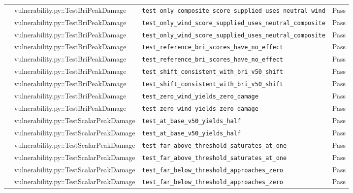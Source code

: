 \documentclass[11pt,a4paper]{article}
\begin{document}
\begin{center}
\begin{longtable}{p{2.2cm} p{4.5cm} p{6.5cm} p{1.4cm}}
     & vulnerability.py::TestBriPeakDamage & \texttt{test\_only\_composite\_score\_supplied\_uses\_neutral\_wind} & \textcolor{green!60!black}{Pass} \\
     & vulnerability.py::TestBriPeakDamage & \texttt{test\_only\_wind\_score\_supplied\_uses\_neutral\_composite} & \textcolor{green!60!black}{Pass} \\
     & vulnerability.py::TestBriPeakDamage & \texttt{test\_only\_wind\_score\_supplied\_uses\_neutral\_composite} & \textcolor{green!60!black}{Pass} \\
     & vulnerability.py::TestBriPeakDamage & \texttt{test\_reference\_bri\_scores\_have\_no\_effect} & \textcolor{green!60!black}{Pass} \\
     & vulnerability.py::TestBriPeakDamage & \texttt{test\_reference\_bri\_scores\_have\_no\_effect} & \textcolor{green!60!black}{Pass} \\
     & vulnerability.py::TestBriPeakDamage & \texttt{test\_shift\_consistent\_with\_bri\_v50\_shift} & \textcolor{green!60!black}{Pass} \\
     & vulnerability.py::TestBriPeakDamage & \texttt{test\_shift\_consistent\_with\_bri\_v50\_shift} & \textcolor{green!60!black}{Pass} \\
     & vulnerability.py::TestBriPeakDamage & \texttt{test\_zero\_wind\_yields\_zero\_damage} & \textcolor{green!60!black}{Pass} \\
     & vulnerability.py::TestBriPeakDamage & \texttt{test\_zero\_wind\_yields\_zero\_damage} & \textcolor{green!60!black}{Pass} \\
     & vulnerability.py::TestScalarPeakDamage & \texttt{test\_at\_base\_v50\_yields\_half} & \textcolor{green!60!black}{Pass} \\
     & vulnerability.py::TestScalarPeakDamage & \texttt{test\_at\_base\_v50\_yields\_half} & \textcolor{green!60!black}{Pass} \\
     & vulnerability.py::TestScalarPeakDamage & \texttt{test\_far\_above\_threshold\_saturates\_at\_one} & \textcolor{green!60!black}{Pass} \\
     & vulnerability.py::TestScalarPeakDamage & \texttt{test\_far\_above\_threshold\_saturates\_at\_one} & \textcolor{green!60!black}{Pass} \\
     & vulnerability.py::TestScalarPeakDamage & \texttt{test\_far\_below\_threshold\_approaches\_zero} & \textcolor{green!60!black}{Pass} \\
     & vulnerability.py::TestScalarPeakDamage & \texttt{test\_far\_below\_threshold\_approaches\_zero} & \textcolor{green!60!black}{Pass} \\

\end{longtable}
\end{center}
\end{document}
